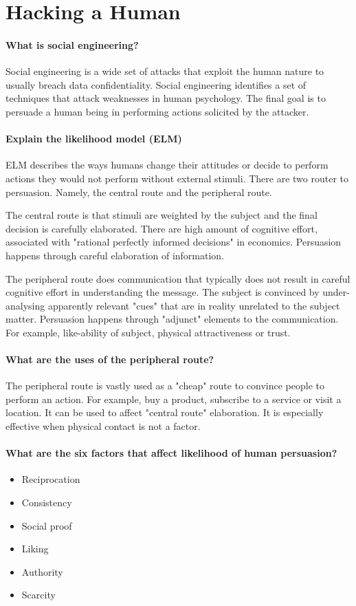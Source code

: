\section{Hacking a Human}
\paragraph{What is social engineering?}
Social engineering is a wide set of attacks that exploit the human nature to usually breach data confidentiality. Social engineering identifies a set of techniques that attack weaknesses in human psychology. The final goal is to persuade a human being in performing actions solicited by the attacker.

\paragraph{Explain the likelihood model (ELM)}
ELM describes the ways humans change their attitudes or decide to perform actions they would not perform without external stimuli. There are two router to persuasion. Namely, the central route and the peripheral route.

The central route is that stimuli are weighted by the subject and the final decision is carefully elaborated. There are high amount of cognitive effort, associated with "rational perfectly informed decisions" in economics. Persuasion happens through careful elaboration of information.

The peripheral route does communication that typically does not result in careful cognitive effort in understanding the message. The subject is convinced by under-analysing apparently relevant "cues" that are in reality unrelated to the subject matter. Persuasion happens through "adjunct" elements to the communication. For example, like-ability of subject, physical attractiveness or trust.

\paragraph{What are the uses of the peripheral route?}
The peripheral route is vastly used as a "cheap" route to convince people to perform an action. For example, buy a product, subscribe to a service or visit a location. It can be used to affect "central route" elaboration. It is especially effective when physical contact is not a factor. 

\paragraph{What are the six factors that affect likelihood of human persuasion?}
\begin{itemize}
	\item Reciprocation
	\item Consistency
	\item Social proof
	\item Liking
	\item Authority
	\item Scarcity
\end{itemize}

